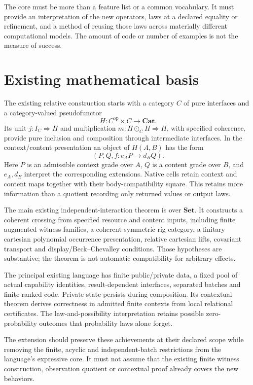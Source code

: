 \documentclass[11pt,a4paper]{article}
\newcommand{\Cat}{\mathbf{Cat}}
\begin{document}
The core must be more than a feature list or a common vocabulary. It must provide an interpretation of the new operators, laws at a declared equality or refinement, and a method of reusing those laws across materially different computational models. The amount of code or number of examples is not the measure of success.

\section{Existing mathematical basis}\label{sec:basis}

The existing relative construction starts with a category \(C\) of pure interfaces and a category-valued pseudofunctor
\[
H:C^{\mathrm{op}}\times C\longrightarrow\Cat.
\]
Its unit \(j:I_C\Rightarrow H\) and multiplication \(m:H\odot_C H\Rightarrow H\), with specified coherence, provide pure inclusion and composition through intermediate interfaces. In the context/content presentation an object of \(H(A,B)\) has the form
\[
(P,Q,f:e_A P\longrightarrow d_B Q).
\]
Here \(P\) is an admissible context grade over \(A\), \(Q\) is a content grade over \(B\), and \(e_A,d_B\) interpret the corresponding extensions. Native cells retain context and content maps together with their body-compatibility square. This retains more information than a quotient recording only returned values or output laws.

The main existing independent-interaction theorem is over \(\mathbf{Set}\). It constructs a coherent crossing from specified resource and content inputs, including finite augmented witness families, a coherent symmetric rig category, a finitary cartesian polynomial occurrence presentation, relative cartesian lifts, covariant transport and display/Beck--Chevalley conditions. Those hypotheses are substantive; the theorem is not automatic compatibility for arbitrary effects.

The principal existing language has finite public/private data, a fixed pool of actual capability identities, result-dependent interfaces, separated batches and finite ranked code. Private state persists during composition. Its contextual theorem derives correctness in admitted finite contexts from local relational certificates. The law-and-possibility interpretation retains possible zero-probability outcomes that probability laws alone forget.

The extension should preserve these achievements at their declared scope while removing the finite, acyclic and independent-batch restrictions from the language's expressive core. It must not assume that the existing finite witness construction, observation quotient or contextual proof already covers the new behaviors.
\end{document}
